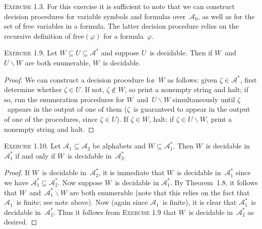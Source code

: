 \documentclass[letterpaper]{article}
\newcommand{\free}{\mathrm{free}}
\theoremstyle{remark}
\begin{document}
\noindent\textsc{Exercise 1.3.} For this exercise it is sufficient to note that we can construct decision procedures for variable symbols and formulas over~$\mathcal{A}_0$, as well as for the set of free variables in a formula. The latter decision procedure relies on the recursive definition of $\free(\varphi)$ for a formula~$\varphi$.

\bigskip\noindent\textsc{Exercise 1.9.}
Let $W\subseteq U\subseteq\mathcal{A}^*$ and suppose $U$~is decidable. Then if $W$~and~$U\backslash W$ are both enumerable, $W$~is decidable.
\begin{proof}
We can construct a decision procedure for~$W$ as follows: given $\zeta\in\mathcal{A}^*$, first determine whether $\zeta\in U$. If not, $\zeta\not\in W$, so print a nonempty string and halt; if so, run the enumeration procedures for $W$~and~$U\backslash W$ simultaneously until $\zeta$~appears in the output of one of them ($\zeta$~is guaranteed to appear in the output of one of the procedures, since $\zeta\in U$). If $\zeta\in W$, halt; if $\zeta\in U\backslash W$, print a nonempty string and halt.
\end{proof}

\noindent\textsc{Exercise 1.10.} Let $\mathcal{A}_1\subseteq\mathcal{A}_2$ be alphabets and $W\subseteq\mathcal{A}_1^*$. Then $W$~is decidable in~$\mathcal{A}_1^*$ if and only if $W$~is decidable in~$\mathcal{A}_2^*$.
\begin{proof}
If $W$~is decidable in~$\mathcal{A}_2^*$, it is immediate that $W$~is decidable in~$\mathcal{A}_1^*$ since we have $\mathcal{A}_1^*\subseteq\mathcal{A}_2^*$. Now suppose $W$~is decidable in $\mathcal{A}_1^*$. By Theorem~1.8, it follows that $W$~and~$\mathcal{A}_1^*\backslash W$ are both enumerable (note that this relies on the fact that $\mathcal{A}_1$~is finite; see note above). Now (again since $\mathcal{A}_1$~is finite), it is clear that $\mathcal{A}_1^*$~is decidable in~$\mathcal{A}_2^*$. Thus it follows from \textsc{Exercise 1.9} that $W$~is decidable in~$\mathcal{A}_2^*$ as desired.
\end{proof}
\end{document}

